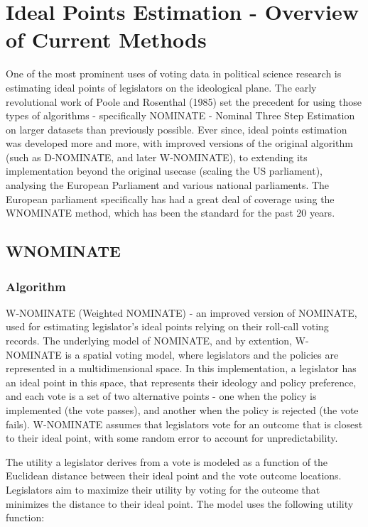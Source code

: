 \documentclass{report}
\begin{document}
    \chapter{Ideal Points Estimation - Overview of Current Methods}
    One of the most prominent uses of voting data in political science research is estimating ideal points of
    legislators on the ideological plane. The early revolutional work of Poole and Rosenthal (1985) set the
    precedent for using those types of algorithms - specifically NOMINATE - Nominal Three Step Estimation on
    larger datasets than previously possible. Ever since, ideal points estimation was developed more and more,
    with improved versions of the original algorithm (such as D-NOMINATE, and later W-NOMINATE), to extending
    its implementation beyond the original usecase (scaling the US parliament), analysing the European
    Parliament and various national parliaments. The European parliament specifically has had a great deal of
    coverage using the WNOMINATE method, which has been the standard for the past 20 years.


    \section{WNOMINATE}

    \subsection{Algorithm}

    W-NOMINATE (Weighted NOMINATE) - an improved version of NOMINATE, used for estimating legislator's
    ideal points relying on their roll-call voting records. The underlying model of NOMINATE, and by
    extention, W-NOMINATE is a spatial voting model, where legislators and the policies are represented
    in a multidimensional space. In this implementation, a legislator has an ideal point in this space,
    that represents their ideology and policy preference, and each vote is a set of two alternative
    points - one when the policy is implemented (the vote passes), and another when the policy is
    rejected (the vote fails). W-NOMINATE assumes that legislators vote for an outcome that is closest
    to their ideal point, with some random error to account for unpredictability.

    The utility a legislator derives from a vote is modeled as a function of the Euclidean distance between
    their ideal point and the vote outcome locations. Legislators aim to maximize their utility by voting
    for the outcome that minimizes the distance to their ideal point. The model uses the following utility
    function:
\end{document}
